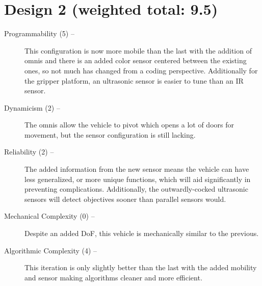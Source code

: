 \documentclass[11pt]{report}
\begin{document}
\section{Design 2 (weighted total: 9.5)}\label{matrixdesign2}
\begin{greylineformat}
\begin{description}
    \item[Programmability (5) --]This configuration is now more mobile than the last with the addition of \glspl{omni} and there is an added color sensor centered between the existing ones, so not much has changed from a coding perspective. Additionally for the gripper platform, an ultrasonic sensor is easier to tune than an \gls{IR} sensor.
    \item[Dynamicism (2) --] The \glspl{omni} allow the vehicle to pivot which opens a lot of doors for movement, but the sensor configuration is still lacking.
    \item[Reliability (2) --] The added information from the new sensor means the vehicle can have less generalized, or more unique functions, which will aid significantly in preventing complications. Additionally, the outwardly-cocked ultrasonic sensors will detect objectives sooner than parallel sensors would.
    \item[Mechanical Complexity (0) --]Despite an added \acrlong{DoF}, this vehicle is mechanically similar to the previous. 
    \item[Algorithmic Complexity (4) --]This iteration is only slightly better than the last with the added mobility and sensor making algorithms cleaner and more efficient.
\end{description}
\end{greylineformat}
\end{document}
